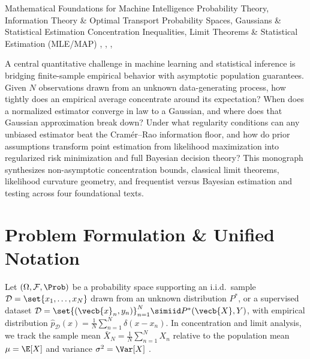 \documentclass[../../../../master.tex]{subfiles}
\begin{document}
\monographleaf
  {Mathematical Foundations for Machine Intelligence}
  {Probability Theory, Information Theory \& Optimal Transport}
  {Probability Spaces, Gaussians \& Statistical Estimation}
  {Concentration Inequalities, Limit Theorems \& Statistical Estimation (MLE/MAP)}
  {,
   ,
   ,
   }

A central quantitative challenge in machine learning and statistical inference is bridging finite-sample empirical behavior with asymptotic population guarantees. Given $N$ observations drawn from an unknown data-generating process, how tightly does an empirical average concentrate around its expectation? When does a normalized estimator converge in law to a Gaussian, and where does that Gaussian approximation break down? Under what regularity conditions can any unbiased estimator beat the Cram\'er--Rao information floor, and how do prior assumptions transform point estimation from likelihood maximization into regularized risk minimization and full Bayesian decision theory? This monograph synthesizes non-asymptotic concentration bounds, classical limit theorems, likelihood curvature geometry, and frequentist versus Bayesian estimation and testing across four foundational texts.

\section{Problem Formulation \& Unified Notation}
\label{sec:asymp:formulation}

Let $(\Omega, \mathcal{F}, \Prob)$ be a probability space supporting an i.i.d.\ sample $\mathcal{D} = \set{x_1, \dots, x_N}$ drawn from an unknown distribution $P^*$, or a supervised dataset $\mathcal{D} = \set{(\vecb{x}_n, y_n)}_{n=1}^N \simiid P^*(\vecb{X}, Y)$, with empirical distribution $\hat{p}_{\mathcal{D}}(x) = \frac{1}{N}\sum_{n=1}^N \delta(x - x_n)$. In concentration and limit analysis, we track the sample mean $\bar{X}_N = \frac{1}{N}\sum_{n=1}^N X_n$ relative to the population mean $\mu = \E[X]$ and variance $\sigma^2 = \Var[X]$ .
\end{document}
